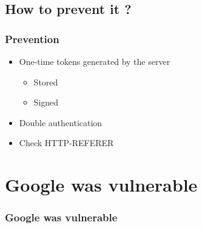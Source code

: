 \documentclass[svgnames]{beamer}
\begin{document}
\subsection{How to prevent it ?}
\begin{frame}
  \frametitle{Prevention} %
  \begin{itemize}
   \item One-time tokens generated by the server
   \begin{itemize}
    \item Stored  %
    \item Signed  %
   \end{itemize}
   \item Double authentication %
   \item Check HTTP-REFERER %

  \end{itemize}

\end{frame}




\section{Google was vulnerable}
\begin{frame}
  \frametitle{Google was vulnerable}
  \tableofcontents[currentsection]
\end{frame}
	
\end{document}
